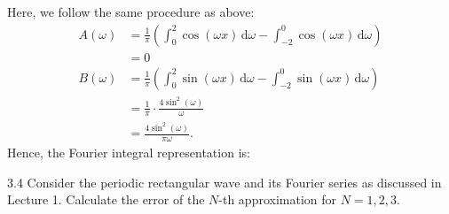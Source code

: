 \begin{derivation}
  Here, we follow the same procedure as above:
  \begin{align*}
    A(\omega) &= \frac{1}{\pi} \left( \int_{0}^{2} \cos (\omega x) \, \mathrm{d}\omega - \int_{-2}^{0} \cos (\omega x) \, \mathrm{d}\omega \right) \\
    &= 0 \\
    B(\omega) &= \frac{1}{\pi} \left( \int_{0}^{2} \sin \left( \omega x \right) \, \mathrm{d}\omega - \int_{-2}^{0} \sin \left( \omega x \right) \, \mathrm{d}\omega \right) \\
    &= \frac{1}{\pi}\cdot \frac{4 \sin^2(\omega)}{\omega} \\
    &= \frac{4 \sin^2(\omega)}{\pi \omega}
  .\end{align*}
  Hence, the Fourier integral representation is:
\end{derivation}



\begin{problem}{3.4}
Consider the periodic rectangular wave and its Fourier series as discussed in Lecture 1. Calculate the error of the $N$-th approximation for $N = 1,2,3$.
\end{problem}

